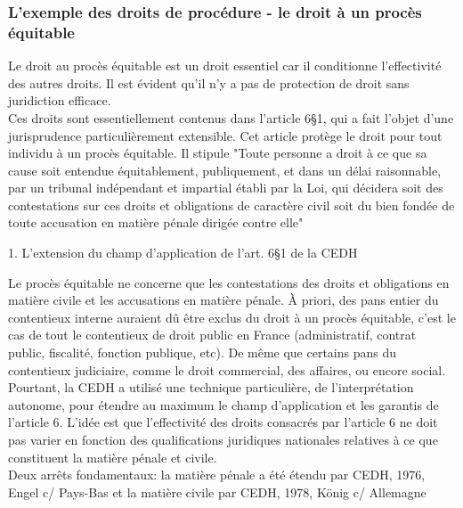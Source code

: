 \documentclass[10pt, a4paper, openany]{book}
\begin{document}
\subsubsection{L'exemple des droits de procédure - le droit à un procès équitable}

Le droit au procès équitable est un droit essentiel car il conditionne l'effectivité des autres droits. Il est évident qu'il n'y a pas de protection de droit sans juridiction efficace. \\
Ces droits sont essentiellement contenus dans l'article 6§1, qui a fait l'objet d'une jurisprudence particulièrement extensible. Cet article protège le droit pour tout individu à un procès équitable. Il stipule "Toute personne a droit à ce que sa cause soit entendue équitablement, publiquement, et dans un délai raisonnable, par un tribunal indépendant et impartial établi par la Loi, qui décidera soit des contestations sur ces droits et obligations de caractère civil soit du bien fondée de toute accusation en matière pénale dirigée contre elle"


1. L'extension du champ d'application de l'art. 6§1 de la CEDH


Le procès équitable ne concerne que les contestations des droits et obligations en matière civile et les accusations en matière pénale. À priori, des pans entier du contentieux interne auraient dû être exclus du droit à un procès équitable, c'est le cas de tout le contentieux de droit public en France (administratif, contrat public, fiscalité, fonction publique, etc). De même que certains pans du contentieux judiciaire, comme le droit commercial, des affaires, ou encore social. \\
Pourtant, la CEDH a utilisé une technique particulière, de l'interprétation autonome, pour étendre au maximum le champ d'application et les garantis de l'article 6. L'idée est que l'effectivité des droits consacrés par l'article 6 ne doit pas varier en fonction des qualifications juridiques nationales relatives à ce que constituent la matière pénale et civile. \\
Deux arrêts fondamentaux: la matière pénale a été étendu par CEDH, 1976, Engel c/ Pays-Bas et la matière civile par CEDH, 1978, König c/ Allemagne
\end{document}
